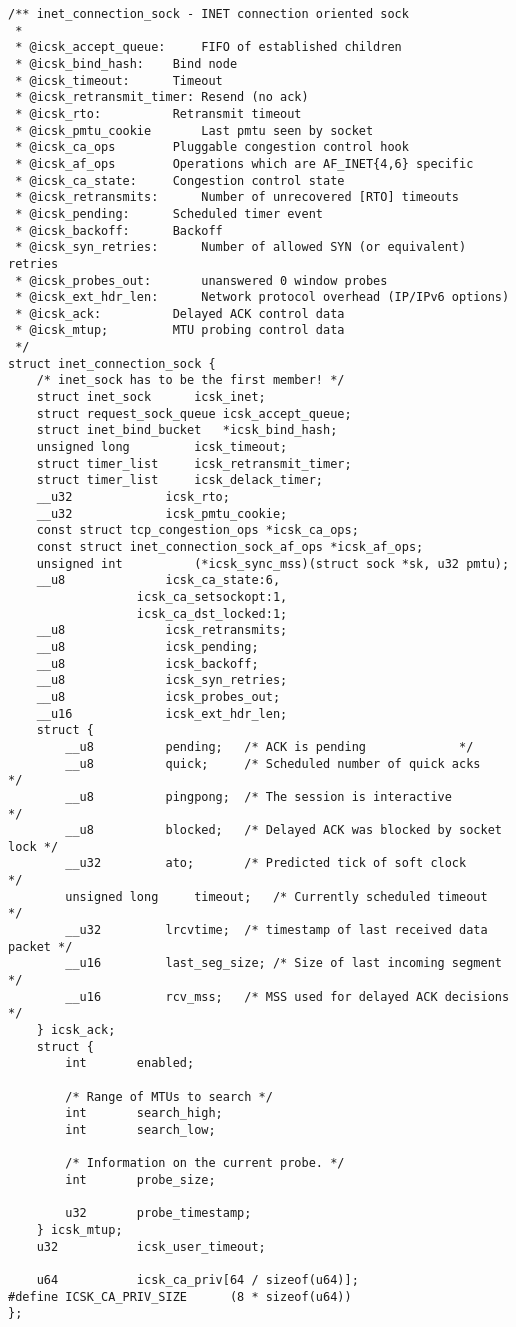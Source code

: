 \begin{verbatim}
/** inet_connection_sock - INET connection oriented sock
 *
 * @icsk_accept_queue:     FIFO of established children 
 * @icsk_bind_hash:    Bind node
 * @icsk_timeout:      Timeout
 * @icsk_retransmit_timer: Resend (no ack)
 * @icsk_rto:          Retransmit timeout
 * @icsk_pmtu_cookie       Last pmtu seen by socket
 * @icsk_ca_ops        Pluggable congestion control hook
 * @icsk_af_ops        Operations which are AF_INET{4,6} specific
 * @icsk_ca_state:     Congestion control state
 * @icsk_retransmits:      Number of unrecovered [RTO] timeouts
 * @icsk_pending:      Scheduled timer event
 * @icsk_backoff:      Backoff
 * @icsk_syn_retries:      Number of allowed SYN (or equivalent) retries
 * @icsk_probes_out:       unanswered 0 window probes
 * @icsk_ext_hdr_len:      Network protocol overhead (IP/IPv6 options)
 * @icsk_ack:          Delayed ACK control data
 * @icsk_mtup;         MTU probing control data
 */
struct inet_connection_sock {
    /* inet_sock has to be the first member! */
    struct inet_sock      icsk_inet;
    struct request_sock_queue icsk_accept_queue;
    struct inet_bind_bucket   *icsk_bind_hash;
    unsigned long         icsk_timeout;
    struct timer_list     icsk_retransmit_timer;
    struct timer_list     icsk_delack_timer;
    __u32             icsk_rto;
    __u32             icsk_pmtu_cookie;
    const struct tcp_congestion_ops *icsk_ca_ops;
    const struct inet_connection_sock_af_ops *icsk_af_ops;
    unsigned int          (*icsk_sync_mss)(struct sock *sk, u32 pmtu);
    __u8              icsk_ca_state:6,
                  icsk_ca_setsockopt:1,
                  icsk_ca_dst_locked:1;
    __u8              icsk_retransmits;
    __u8              icsk_pending;
    __u8              icsk_backoff;
    __u8              icsk_syn_retries;
    __u8              icsk_probes_out;
    __u16             icsk_ext_hdr_len;
    struct {
        __u8          pending;   /* ACK is pending             */
        __u8          quick;     /* Scheduled number of quick acks     */
        __u8          pingpong;  /* The session is interactive         */
        __u8          blocked;   /* Delayed ACK was blocked by socket lock */
        __u32         ato;       /* Predicted tick of soft clock       */
        unsigned long     timeout;   /* Currently scheduled timeout        */
        __u32         lrcvtime;  /* timestamp of last received data packet */
        __u16         last_seg_size; /* Size of last incoming segment      */
        __u16         rcv_mss;   /* MSS used for delayed ACK decisions     */ 
    } icsk_ack;
    struct {
        int       enabled;

        /* Range of MTUs to search */
        int       search_high;
        int       search_low;

        /* Information on the current probe. */
        int       probe_size;

        u32       probe_timestamp;
    } icsk_mtup;
    u32           icsk_user_timeout;

    u64           icsk_ca_priv[64 / sizeof(u64)];
#define ICSK_CA_PRIV_SIZE      (8 * sizeof(u64))
};
\end{verbatim}

